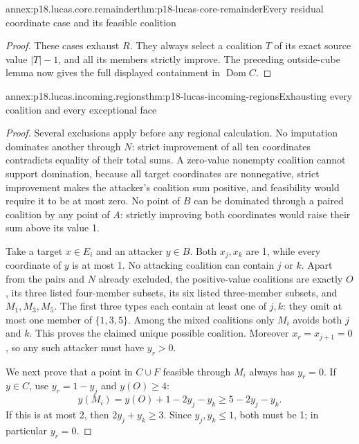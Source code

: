 \begin{annexitem}{annex:p18.lucas.core.remainder}{thm:p18-lucas-core-remainder}{Every residual coordinate case and its feasible coalition}
\begin{proof}
These cases exhaust \(R\). They always select a coalition
\(T\) of its exact source value \(|T|-1\), and all its members
strictly improve. The preceding outside-cube lemma now
gives the full displayed containment in \(\operatorname{Dom}C\).
\end{proof}
\end{annexitem}

\begin{annexitem}{annex:p18.lucas.incoming.regions}{thm:p18-lucas-incoming-regions}{Exhausting every coalition and every exceptional face}
\begin{proof}
Several exclusions apply before any regional calculation.
No imputation dominates another through \(N\): strict
improvement of all ten coordinates contradicts equality
of their total sums. A zero-value nonempty coalition cannot
support domination, because all target coordinates are
nonnegative, strict improvement makes the attacker's
coalition sum positive, and feasibility would require it
to be at most zero. No point of \(B\) can be dominated
through a paired coalition by any point of \(A\):
strictly improving both coordinates would raise their sum
above its value 1.

Take a target \(x\in E_i\) and an attacker \(y\in B\).
Both \(x_j,x_k\) are 1, while every coordinate of \(y\)
is at most 1. No attacking coalition can contain \(j\)
or \(k\). Apart from the pairs and \(N\) already excluded,
the positive-value coalitions are exactly \(O\), its three
listed four-member subsets, its six listed three-member
subsets, and \(M_1,M_3,M_5\).
The first three types each contain at least one of \(j,k\):
they omit at most one member of \(\{1,3,5\}\).
Among the mixed coalitions only \(M_i\) avoids both \(j\)
and \(k\). This proves the claimed unique possible coalition.
Moreover \(x_r=x_{j+1}=0\), so any such attacker must
have \(y_r>0\).

We next prove that a point in \(C\cup F\) feasible through
\(M_i\) always has \(y_r=0\).
If \(y\in C\), use \(y_r=1-y_j\) and \(y(O)\geq4\):
\[
             y(M_i)=y(O)+1-2y_j-y_k
                                      \geq5-2y_j-y_k.
\]
If this is at most 2, then \(2y_j+y_k\geq3\).
Since \(y_j,y_k\leq1\), both must be 1; in particular
\(y_r=0\).


\end{proof}
\end{annexitem}
